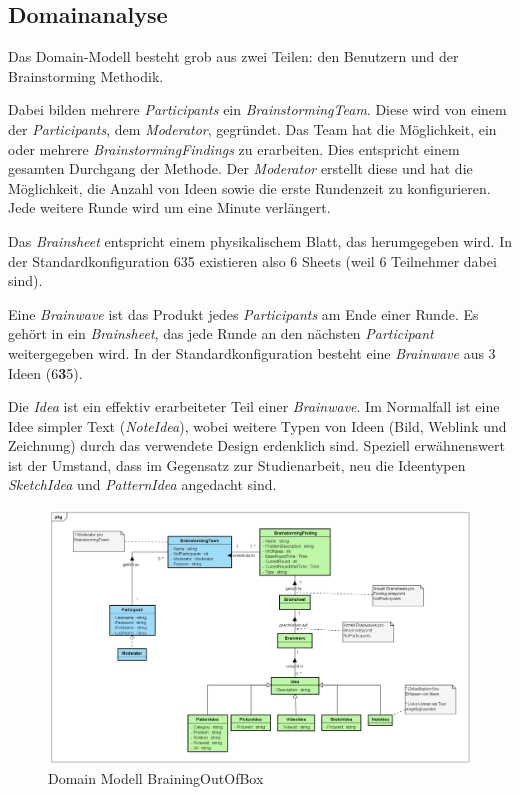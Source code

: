 \subsection{Domainanalyse}

Das Domain-Modell besteht grob aus zwei Teilen: den Benutzern und der Brainstorming Methodik. 

Dabei bilden mehrere \textit{Participants} ein \textit{BrainstormingTeam}. Diese wird von einem der \textit{Participants}, dem \textit{Moderator}, gegründet.  Das Team hat die Möglichkeit, ein oder mehrere \textit{BrainstormingFindings} zu erarbeiten. Dies entspricht einem gesamten Durchgang der Methode. Der \textit{Moderator }erstellt diese und hat die Möglichkeit, die Anzahl von Ideen sowie die erste Rundenzeit zu konfigurieren. Jede weitere Runde wird um eine Minute verlängert.

Das \textit{Brainsheet} entspricht einem physikalischem Blatt, das herumgegeben wird. In der Standardkonfiguration 635 existieren also 6 Sheets (weil 6 Teilnehmer dabei sind).

Eine \textit{Brainwave} ist das Produkt jedes \textit{Participants }am Ende einer Runde. Es gehört in ein \textit{Brainsheet}, das jede Runde an den nächsten \textit{Participant }weitergegeben wird. In der Standardkonfiguration besteht eine \textit{Brainwave }aus 3 Ideen (6\textbf{3}5).

Die \textit{Idea} ist ein effektiv erarbeiteter Teil einer \textit{Brainwave}. Im Normalfall ist eine Idee simpler Text (\textit{NoteIdea}), wobei weitere Typen von Ideen (Bild, Weblink und Zeichnung) durch das verwendete Design erdenklich sind. Speziell erwähnenswert ist der Umstand, dass im Gegensatz zur Studienarbeit, neu die Ideentypen \textit{SketchIdea }und \textit{PatternIdea }angedacht sind.

\begin{figure}[h]
	\centering
	\includegraphics[width=1\linewidth]{img/domain-analyse/DomainModell-Methode635}
	\caption{Domain Modell BrainingOutOfBox}
	\label{fig:domainmodell-methode635}
\end{figure}

